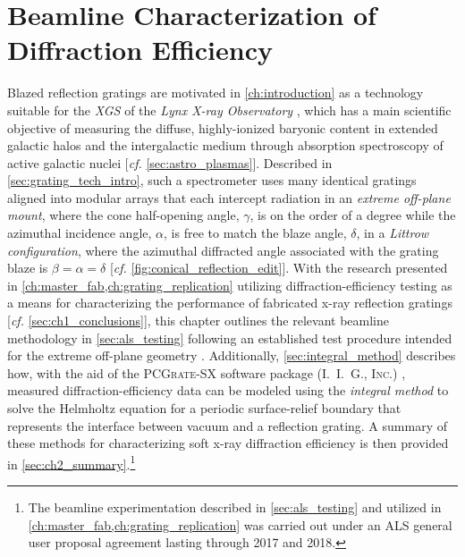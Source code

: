 \chapter[Beamline Characterization of Diffraction Efficiency]{Beamline Characterization of \\Diffraction Efficiency}\label{ch:diff_eff} 
Blazed reflection gratings are motivated in \cref{ch:introduction} as a technology suitable for the \emph{XGS} of the \emph{Lynx X-ray Observatory} \cite{Lynx_web,Gaskin19}, which has a main scientific objective of measuring the diffuse, highly-ionized baryonic content in extended galactic halos and the intergalactic medium through absorption spectroscopy of active galactic nuclei [\emph{cf.\@} \cref{sec:astro_plasmas}]. 
Described in \cref{sec:grating_tech_intro}, such a spectrometer uses many identical gratings aligned into modular arrays that each intercept radiation in an \emph{extreme off-plane mount}, where the cone half-opening angle, $\gamma$, is on the order of a degree while the azimuthal incidence angle, $\alpha$, is free to match the blaze angle, $\delta$, in a \emph{Littrow configuration}, where the azimuthal diffracted angle associated with the grating blaze is $\beta = \alpha = \delta$ [\emph{cf.\@} \cref{fig:conical_reflection_edit}]. 
With the research presented in \cref{ch:master_fab,ch:grating_replication} utilizing diffraction-efficiency testing as a means for characterizing the performance of fabricated x-ray reflection gratings [\emph{cf.\@} \cref{sec:ch1_conclusions}], this chapter outlines the relevant beamline methodology in \cref{sec:als_testing} following an established test procedure intended for the extreme off-plane geometry \cite{Miles18}. 
Additionally, \cref{sec:integral_method} describes how, with the aid of the \textsc{PCGrate-SX} software package (\textsc{I.\ I.\ G., Inc.\@}) \cite{PCGrate_web}, measured diffraction-efficiency data can be modeled using the \emph{integral method} to solve the Helmholtz equation for a periodic surface-relief boundary that represents the interface between vacuum and a reflection grating. 
A summary of these methods for characterizing soft x-ray diffraction efficiency is then provided in \cref{sec:ch2_summary}.\footnote{The beamline experimentation described in \cref{sec:als_testing} and utilized in \cref{ch:master_fab,ch:grating_replication} was carried out under an ALS general user proposal agreement lasting through 2017 and 2018.} 

